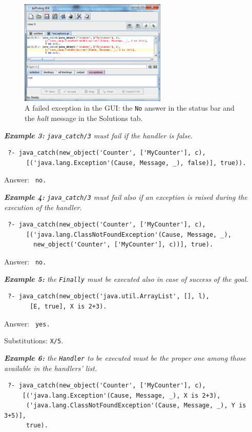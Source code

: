 \begin{figure}
  \centering
  \includegraphics[width=7cm]{images/exceptions2}
  \caption{A failed exception in the \tuprolog{} GUI: the \texttt{No} answer in the status bar and the \textit{halt} message in the Solutions tab.}
  \label{fig:exceptions2}
\end{figure}


\medskip\noindent
\textit{\textbf{Example 3:} \texttt{java\_catch/3} must fail if the handler is false.}
\begin{verbatim}
 ?- java_catch(new_object('Counter', ['MyCounter'], c),
      [('java.lang.Exception'(Cause, Message, _), false)], true)).
\end{verbatim}

Answer: \texttt{ no.}

\medskip\noindent
\textit{\textbf{Example 4:} \texttt{java\_catch/3} must fail also if an exception is raised during the execution of the handler.}
\begin{verbatim}
 ?- java_catch(new_object('Counter', ['MyCounter'], c),
      [('java.lang.ClassNotFoundException'(Cause, Message, _),
        new_object('Counter', ['MyCounter'], c))], true).
\end{verbatim}

Answer: \texttt{ no.}

\medskip\noindent
\textit{\textbf{Example 5:} the \textit{\texttt{Finally}} must be executed also in case of success of the goal.}
\begin{verbatim}
 ?- java_catch(new_object('java.util.ArrayList', [], l),
       [E, true], X is 2+3).
\end{verbatim}

Answer: \texttt{ yes.}

Substitutions: \texttt{X/5}.

\medskip\noindent
\textit{\textbf{Example 6:} the \textit{\texttt{Handler}} to be executed must be the proper one among those available in the handlers' list.}
\begin{verbatim}
 ?- java_catch(new_object('Counter', ['MyCounter'], c),
     [('java.lang.Exception'(Cause, Message, _), X is 2+3),
      ('java.lang.ClassNotFoundException'(Cause, Message, _), Y is 3+5)],
      true).
\end{verbatim}

